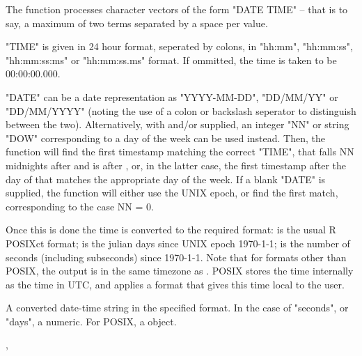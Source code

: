 \documentclass[a4paper]{book}
\begin{document}
\begin{Details}\relax
The function processes character vectors of the form "DATE TIME" -- that is to say, a maximum of two terms separated by a space per value. 

"TIME" is given in 24 hour format, seperated by colons, in "hh:mm", "hh:mm:ss", "hh:mm:ss:ms" or "hh:mm:ss.ms" format. If ommitted, the time is taken to be 00:00:00.000.

"DATE" can be a date representation as "YYYY-MM-DD", "DD/MM/YY" or "DD/MM/YYYY" (noting the use of a colon or backslash seperator to distinguish between the two). Alternatively, with  and/or  supplied, an integer "NN" or string "DOW" corresponding to a day of the week can be used instead. Then, the function will find the first timestamp matching the correct "TIME", that falls NN midnights after  and is after , or, in the latter case, the first timestamp after the day of  that matches the appropriate day of the week. If a blank "DATE" is supplied, the function will either use the UNIX epoch, or find the first match, corresponding to the case NN = 0.

Once this is done the time is converted to the required format:  is the usual R POSIXct format;  is the julian days since UNIX epoch 1970-1-1;  is the number of seconds (including subseconds) since 1970-1-1. Note that for formats other than POSIX, the output is in the same timezone as . POSIX stores the time internally as the time in UTC, and applies a format that gives this time local to the user.
\end{Details}
%
\begin{Value}
A converted date-time string in the specified format. In the case of "seconds", or "days", a numeric. For POSIX, a  object.
\end{Value}
%
\begin{SeeAlso}\relax
{}, 
\end{SeeAlso}
%
\end{document}
